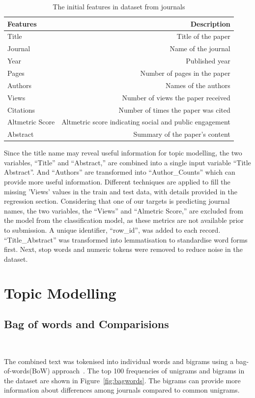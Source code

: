 \documentclass[9pt,twocolumn,twoside]{pnas-new}
\begin{document}
\begin{table}[!htbp]
\centering
\caption{The initial features in dataset from journals}
\begin{tabular}{lr}
\toprule
Features & Description  \\
\midrule
Title & Title of the paper  \\
Journal & Name of the journal  \\
Year & Published year \\
Pages & Number of pages in the paper \\
Authors & Names of the authors \\
Views & Number of views the paper received \\
Citations & Number of times the paper was cited \\
Altmetric Score & Altmetric score indicating social and public engagement \\
Abstract & Summary of the paper's content \\
\bottomrule
\end{tabular}
\label{tab:table1}
\end{table}

Since the title name may reveal useful information for topic modelling, the two variables, ``Title'' and ``Abstract,'' are combined into a single input variable ``Title Abstract''. And ``Authors'' are transformed into ``Author\_Counts'' which can provide more useful information. Different techniques are applied to fill the missing 'Views' values in the train and test data, with details provided in the regression section. Considering that one of our targets is predicting journal names, the two variables, the ``Views'' and ``Almetric Score,'' are excluded from the model from the classification model, as these metrics are not available prior to submission.  A unique identifier, ``row\_id'', was added to each record.  ``Title\_Abstract'' was transformed into lemmatisation to standardise word forms first. Next, stop words and numeric tokens were removed to reduce noise in the dataset.

\section{Topic Modelling}
\subsection*{Bag of words and Comparisions} \

\noindent The combined text was tokenised into individual words and bigrams using a bag-of-words(BoW) approach~\cite{8950616}. The top 100 frequencies of unigrams and bigrams in the dataset are shown in Figure~\ref{fig:bagwords}. The bigrams can provide more information about differences among journals compared to common unigrams.
\end{document}
